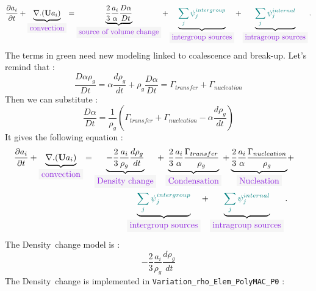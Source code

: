 \begin{equation}
\frac{\partial a_{i}}{\partial t}+\underbrace{\nabla.(\mathbf{U} a_{i})}_{\colorbox{codebackground}{\color{codekeyword3} convection}}=\underbrace{\frac{2}{3}\frac{a_{i}}{\alpha}\frac{D\alpha}{Dt}}_{\colorbox{codebackground}{\color{codekeyword3} source\ of\ volume\ change}}+\underbrace{\color{myteal}\sum_j \psi^{intergroup}_{j}}_{\colorbox{codebackground}{\color{codekeyword3} intergroup\ sources}}+\underbrace{\color{myteal}\sum_j \psi^{internal}_{j}}_{\colorbox{codebackground}{\color{codekeyword3} intragroup sources}}.
\end{equation}
The terms in green need new modeling linked to coalescence and break-up.
Let's remind that :
\begin{equation}
 \frac{D\alpha\rho_g}{Dt}=\alpha\frac{d\rho_g}{dt}+\rho_g\frac{D\alpha}{Dt}=\Gamma_{transfer}+\Gamma_{nucleation}
 \end{equation}
Then we can substitute :
\begin{equation}
 \frac{D\alpha}{Dt}=\frac{1}{\rho_g}(\Gamma_{transfer}+\Gamma_{nucleation}-\alpha\frac{d\rho_g}{dt})
 \end{equation}
It gives the following equation :
\begin{equation}
\begin{aligned}
\frac{\partial a_{i}}{\partial t}+\underbrace{\nabla.(\mathbf{U} a_{i})}_{\colorbox{codebackground}{\color{codekeyword3} convection}}=\underbrace{-\frac{2}{3}\frac{a_{i}}{\rho_g}\frac{d\rho_g}{dt}}_{\colorbox{codebackground}{\color{codekeyword3} Density\ change}}+\underbrace{\frac{2}{3}\frac{a_{i}}{\alpha}\frac{\Gamma_{transfer}}{\rho_g}}_{\colorbox{codebackground}{\color{codekeyword3} Condensation}}+\underbrace{\frac{2}{3}\frac{a_{i}}{\alpha}\frac{\Gamma_{nucleation}}{\rho_g}}_{\colorbox{codebackground}{\color{codekeyword3} Nucleation}}&+ & \\\underbrace{\color{myteal} \sum_j \psi^{intergroup}_{j}}_{\colorbox{codebackground}{\color{codekeyword3} intergroup\ sources}}+\underbrace{\color{myteal} \sum_j \psi^{internal}_{j}}_{\colorbox{codebackground}{\color{codekeyword3} intragroup sources}}.
\end{aligned}
\end{equation}
The {\colorbox{codebackground}{\color{codekeyword3} Density\ change}} model is :
\begin{equation}
    -\frac{2}{3}\frac{a_{i}}{\rho_g}\frac{d\rho_g}{dt}
\end{equation}
The {\colorbox{codebackground}{\color{codekeyword3} Density\ change}} is implemented in \texttt{Variation_rho_Elem_PolyMAC_P0} :
